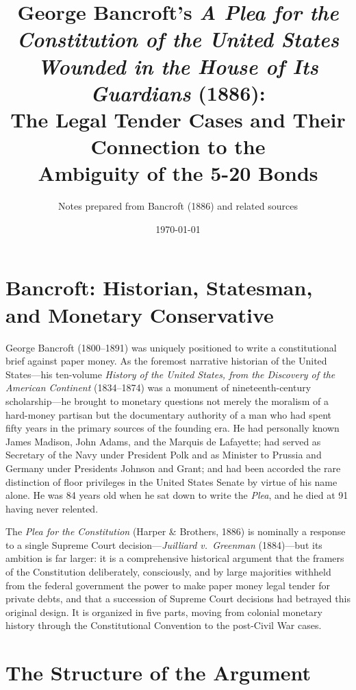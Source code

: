 \documentclass[12pt]{article}
\title{George Bancroft's \textit{A Plea for the Constitution of the
United States Wounded in the House of Its Guardians} (1886):\\
The Legal Tender Cases and Their Connection to the\\
Ambiguity of the 5-20 Bonds}
\author{Notes prepared from Bancroft (1886) and related sources}
\date{\today}
\begin{document}
\maketitle
\thispagestyle{empty}

\newpage
\tableofcontents
\newpage

\section{Bancroft: Historian, Statesman, and Monetary Conservative}

George Bancroft (1800--1891) was uniquely positioned to write a
constitutional brief against paper money. As the foremost narrative
historian of the United States---his ten-volume \textit{History of the
United States, from the Discovery of the American Continent} (1834--1874)
was a monument of nineteenth-century scholarship---he brought to monetary
questions not merely the moralism of a hard-money partisan but the
documentary authority of a man who had spent fifty years in the primary
sources of the founding era. He had personally known James Madison, John
Adams, and the Marquis de Lafayette; had served as Secretary of the Navy
under President Polk and as Minister to Prussia and Germany under
Presidents Johnson and Grant; and had been accorded the rare distinction
of floor privileges in the United States Senate by virtue of his name
alone. He was 84 years old when he sat down to write the \textit{Plea},
and he died at 91 having never relented.

The \textit{Plea for the Constitution} (Harper \& Brothers, 1886) is
nominally a response to a single Supreme Court decision---\textit{Juilliard
v.\ Greenman} (1884)---but its ambition is far larger: it is a
comprehensive historical argument that the framers of the Constitution
deliberately, consciously, and by large majorities withheld from the
federal government the power to make paper money legal tender for private
debts, and that a succession of Supreme Court decisions had betrayed this
original design. It is organized in five parts, moving from colonial
monetary history through the Constitutional Convention to the post-Civil
War cases.

\section{The Structure of the Argument}
\end{document}
